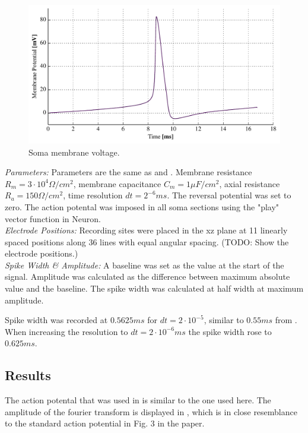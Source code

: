 \documentclass[altfont, fleqn]{uiophd}
\renewcommand{\cref}[1]{{\color{viridis_03}\mycref{#1}} }
\begin{document}
\begin{figure}[h]
\centering
\includegraphics[width=1\textwidth]{images/3_methods/3_1_reproduction/soma_mem.pdf}
\caption{Soma membrane voltage. }
\label{fig:3_1_soma_mem}
\end{figure}


\noindent\emph{Parameters:}
Parameters are the same as \textcite{pettersen_amplitude_2008} and 
\textcite{dayan_theoretical_2001} . Membrane resistance 
$R_m = 3\cdot10^4\Omega /cm^2$, membrane capacitance $C_m=1\mu F / cm^2$, 
axial resistance $R_a = 150\Omega/cm^2$, time resolution $dt=2^{-6}ms$. 
The reversal potential was set to zero. The action potental was imposed in all
soma sections using the "play" vector function in Neuron.
\\

\noindent\emph{Electrode Positions:}
Recording sites were placed in the xz plane at 11 linearly spaced 
positions along 36 lines with equal 
angular spacing. (TODO: Show the electrode positions.) 
\\


\noindent\emph{Spike Width \& Amplitude:}
A baseline was set as the value at the start of the signal. 
Amplitude was calculated as the difference between maximum absolute value and the
baseline.
The spike width was calculated at half width at maximum amplitude. 

Spike width was recorded at $0.5625 ms$ for $dt=2\cdot10^{-5}$, similar to 
$0.55ms$ from \textcite{pettersen_amplitude_2008}. When increasing the
resolution to $dt=2\cdot10^{-6}ms$ the spike width rose to $0.625ms$. 


\subsection{Results}
The action potental that was used in \textcite{pettersen_amplitude_2008} 
is similar to the one used here.  The amplitude of the fourier transform is displayed in
\cref{fig:3_1_fourier}, which is in close resemblance to the standard action potential
in Fig. $3$ in the paper. 
\end{document}
